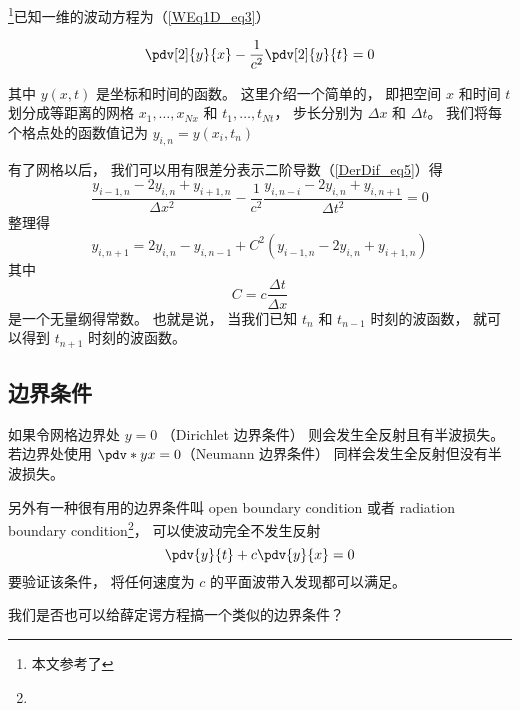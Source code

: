 

\footnote{本文参考了 }已知一维的波动方程为（\autoref{WEq1D_eq3}）
 
\begin{equation}
\pdv[2]{y}{x} - \frac{1}{c^2}\pdv[2]{y}{t} = 0
\end{equation}

其中 $y(x, t)$ 是坐标和时间的函数。 这里介绍一个简单的， 即把空间 $x$ 和时间 $t$ 划分成等距离的网格 $x_1, \dots, x_{Nx}$ 和 $t_1, \dots, t_{Nt}$， 步长分别为 $\Delta x$ 和 $\Delta t$。 我们将每个格点处的函数值记为 $y_{i,n} = y(x_i, t_n)$

有了网格以后， 我们可以用有限差分表示二阶导数（\autoref{DerDif_eq5}）得
\begin{equation}
\frac{y_{i-1,n} - 2y_{i,n} + y_{i+1,n}}{\Delta x^2} - \frac{1}{c^2} \frac{y_{i, n-i} - 2y_{i, n} + y_{i, n+1}}{\Delta t^2} = 0
\end{equation}
整理得
\begin{equation}
y_{i, n+1} = 2y_{i, n} - y_{i, n-1} + C^2(y_{i-1,n} - 2y_{i,n} + y_{i+1,n})
\end{equation}
其中
\begin{equation}
C = c \frac{\Delta t}{\Delta x}
\end{equation}
是一个无量纲得常数。 也就是说， 当我们已知 $t_n$ 和 $t_{n-1}$ 时刻的波函数， 就可以得到 $t_{n+1}$ 时刻的波函数。

\subsection{边界条件}
如果令网格边界处 $y = 0$ （Dirichlet 边界条件） 则会发生全反射且有半波损失。 若边界处使用 $\pdv*{y}{x} = 0$（Neumann 边界条件） 同样会发生全反射但没有半波损失。

另外有一种很有用的边界条件叫 open boundary condition 或者 radiation boundary condition\footnote{}， 可以使波动完全不发生反射
\begin{equation}
\pdv{y}{t} + c\pdv{y}{x} = 0
\end{equation}
要验证该条件， 将任何速度为 $c$ 的平面波带入发现都可以满足。

我们是否也可以给薛定谔方程搞一个类似的边界条件？
